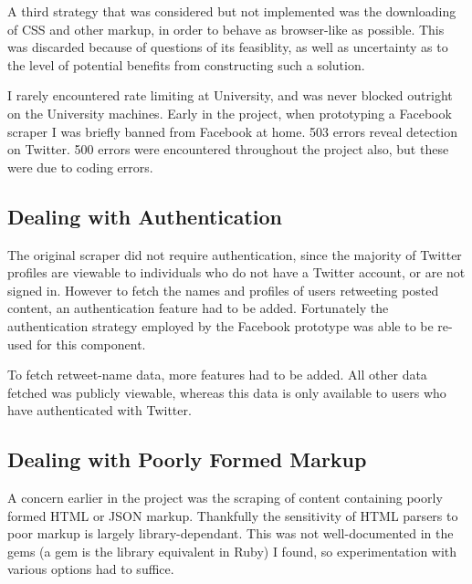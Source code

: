 A third strategy that was considered but not implemented was the downloading of CSS and other markup, in order to behave as browser-like as possible. This was discarded because of questions of its feasiblity, as well as uncertainty as to the level of potential benefits from constructing such a solution. 

I rarely encountered rate limiting at University, and was never blocked outright on the University machines. Early in the project, when prototyping a Facebook scraper I was briefly banned from Facebook at home. 503 errors reveal detection on Twitter. 500 errors were encountered throughout the project also, but these were due to coding errors. 

\subsection{Dealing with Authentication}

The original scraper did not require authentication, since the majority of Twitter profiles are viewable to individuals who do not have a Twitter account, or are not signed in. However to fetch the names and profiles of users retweeting posted content, an authentication feature had to be added. Fortunately the authentication strategy employed by the Facebook prototype was able to be re-used for this component. 

To fetch retweet-name data, more features had to be added. All other data fetched was publicly viewable, whereas this data is only available to users who have authenticated with Twitter.

\subsection{Dealing with Poorly Formed Markup}

A concern earlier in the project was the scraping of content containing poorly formed HTML or JSON markup. Thankfully the sensitivity of HTML parsers to poor markup is largely library-dependant. This was not well-documented in the gems (a gem is the library equivalent in Ruby) I found, so experimentation with various options had to suffice. 





